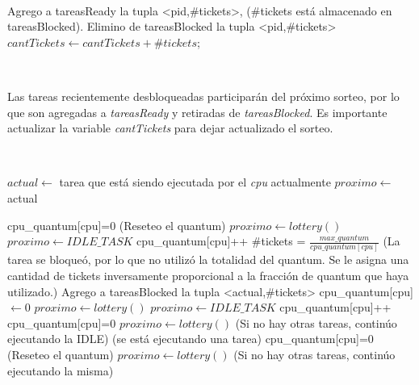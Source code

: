~

\begin{algorithmic}
      \State Agrego a tareasReady la tupla <pid,\#tickets>, (\#tickets está almacenado en tareasBlocked).
      \State Elimino de tareasBlocked la tupla <pid,\#tickets>
      \State $cantTickets \gets cantTickets+\#tickets$;
  \EndFunction
\end{algorithmic}

~

Las tareas recientemente desbloqueadas participarán del próximo sorteo, por lo que son agregadas a \emph{tareasReady} y retiradas de \emph{tareasBlocked}.
Es importante actualizar la variable \emph{cantTickets} para dejar actualizado el sorteo.

~

\begin{algorithmic}
      \State $actual \gets$ tarea que está siendo ejecutada por el \emph{cpu} actualmente
      \State $proximo \gets$ actual
      
	  \State cpu\_quantum[cpu]=0 (Reseteo el quantum)
	      \State $proximo \gets lottery()$
	  \Else
	      \State $proximo \gets IDLE\_TASK$
	  \EndIf
      \EndIf
      \State
	  \State cpu\_quantum[cpu]++ 
	  \State \#tickets = $\frac{max\_quantum}{cpu\_quantum[cpu]}$ 
	  \State
	  \State (La tarea se bloqueó, por lo que no utilizó la totalidad del quantum.
	  \State Se le asigna una cantidad de tickets inversamente proporcional 
	  \State a la fracción de quantum que haya utilizado.)
	  \State
	  \State Agrego a tareasBlocked la tupla <actual,\#tickets>
	  \State cpu\_quantum[cpu] $\gets 0$
	      \State $proximo \gets lottery()$
	  \Else
	      \State $proximo \gets IDLE\_TASK$
	  \EndIf
      \EndIf
      \State
	  \State cpu\_quantum[cpu]++
		  \State cpu\_quantum[cpu]=0 
		  \State $proximo \gets lottery()$
	      \EndIf
	      \State(Si no hay otras tareas, continúo ejecutando la IDLE)
	  \Else(se está ejecutando una tarea)
		      \State cpu\_quantum[cpu]=0 (Reseteo el quantum)
		      \State $proximo \gets lottery()$
		  \EndIf
		  \State(Si no hay otras tareas, continúo ejecutando la misma)
	      \EndIf
	   \EndIf
      \EndIf
  \EndFunction
\end{algorithmic}

